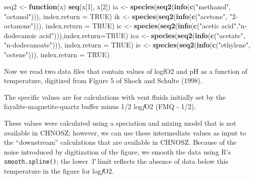 \documentclass[]{tufte-book}
\newenvironment{Shaded}{}{}
\newcommand{\KeywordTok}[1]{\textcolor[rgb]{0.00,0.44,0.13}{\textbf{#1}}}
\newcommand{\DataTypeTok}[1]{\textcolor[rgb]{0.56,0.13,0.00}{#1}}
\newcommand{\DecValTok}[1]{\textcolor[rgb]{0.25,0.63,0.44}{#1}}
\newcommand{\StringTok}[1]{\textcolor[rgb]{0.25,0.44,0.63}{#1}}
\newcommand{\OtherTok}[1]{\textcolor[rgb]{0.00,0.44,0.13}{#1}}
\newcommand{\ControlFlowTok}[1]{\textcolor[rgb]{0.00,0.44,0.13}{\textbf{#1}}}
\newcommand{\NormalTok}[1]{#1}
\begin{document}
\begin{Shaded}
\begin{Highlighting}[]
\NormalTok{seq2 <-}\StringTok{ }\ControlFlowTok{function}\NormalTok{(x) }\KeywordTok{seq}\NormalTok{(x[}\DecValTok{1}\NormalTok{], x[}\DecValTok{2}\NormalTok{])}
\NormalTok{ia <-}\StringTok{ }\KeywordTok{species}\NormalTok{(}\KeywordTok{seq2}\NormalTok{(}\KeywordTok{info}\NormalTok{(}\KeywordTok{c}\NormalTok{(}\StringTok{"methanol"}\NormalTok{, }\StringTok{"octanol"}\NormalTok{))), }\DataTypeTok{index.return =} \OtherTok{TRUE}\NormalTok{)}
\NormalTok{ik <-}\StringTok{ }\KeywordTok{species}\NormalTok{(}\KeywordTok{seq2}\NormalTok{(}\KeywordTok{info}\NormalTok{(}\KeywordTok{c}\NormalTok{(}\StringTok{"acetone"}\NormalTok{, }\StringTok{"2-octanone"}\NormalTok{))), }\DataTypeTok{index.return =} \OtherTok{TRUE}\NormalTok{)}
\NormalTok{ic <-}\StringTok{ }\KeywordTok{species}\NormalTok{(}\KeywordTok{seq2}\NormalTok{(}\KeywordTok{info}\NormalTok{(}\KeywordTok{c}\NormalTok{(}\StringTok{"acetic acid"}\NormalTok{,}\StringTok{"n-dodecanoic acid"}\NormalTok{))),}\DataTypeTok{index.return=}\OtherTok{TRUE}\NormalTok{)}
\NormalTok{ica <-}\StringTok{ }\KeywordTok{species}\NormalTok{(}\KeywordTok{seq2}\NormalTok{(}\KeywordTok{info}\NormalTok{(}\KeywordTok{c}\NormalTok{(}\StringTok{"acetate"}\NormalTok{, }\StringTok{"n-dodecanoate"}\NormalTok{))), }\DataTypeTok{index.return =} \OtherTok{TRUE}\NormalTok{)}
\NormalTok{ie <-}\StringTok{ }\KeywordTok{species}\NormalTok{(}\KeywordTok{seq2}\NormalTok{(}\KeywordTok{info}\NormalTok{(}\KeywordTok{c}\NormalTok{(}\StringTok{"ethylene"}\NormalTok{, }\StringTok{"octene"}\NormalTok{))), }\DataTypeTok{index.return =} \OtherTok{TRUE}\NormalTok{)}
\end{Highlighting}
\end{Shaded}

Now we read two data files that contain values of logfO2 and pH as a
function of temperature, digitized from Figure 5 of Shock and Schulte
(1998).

\begin{marginfigure}
The specific values are for calculations with vent fluids initially set
by the fayalite-magnetite-quartz buffer minus 1/2 log\emph{f}O2 (FMQ -
1/2).
\end{marginfigure}

These values were calculated using a speciation and mixing model that is
not available in CHNOSZ; however, we can use these intermediate values
as input to the ``downstream'' calculations that are available in
CHNOSZ. Because of the noise introduced by digitization of the figure,
we smooth the data using R's \texttt{smooth.spline()}; the lower
\emph{T} limit reflects the absence of data below this temperature in
the figure for log\emph{f}O2.
\end{document}
